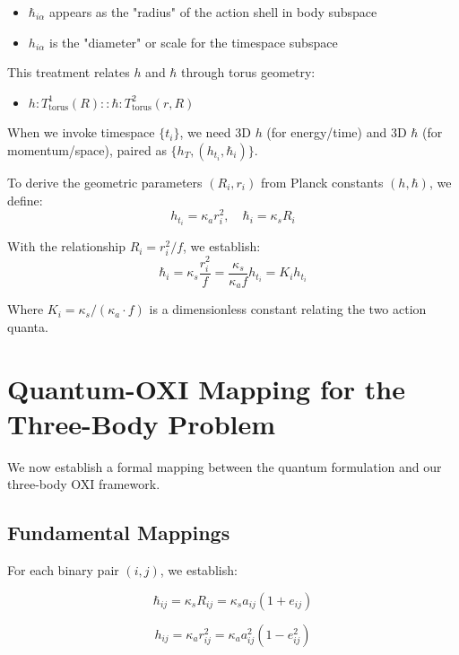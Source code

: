 \documentclass{article}
\begin{document}
\begin{itemize}
\item $\hbar_{i\alpha}$ appears as the "radius" of the action shell in body subspace
\item $h_{i\alpha}$ is the "diameter" or scale for the timespace subspace
\end{itemize}

This treatment relates $h$ and $\hbar$ through torus geometry:
\begin{itemize}
\item $h : T^1_{\text{torus}}(R) :: \hbar : T^2_{\text{torus}}(r, R)$
\end{itemize}

When we invoke timespace $\{t_i\}$, we need 3D $h$ (for energy/time) and 3D $\hbar$ (for momentum/space), paired as $\{h_T, (h_{t_i}, \hbar_i)\}$.

To derive the geometric parameters $(R_i, r_i)$ from Planck constants $(h, \hbar)$, we define:
\begin{equation}
h_{t_i} = \kappa_a r_i^2, \quad \hbar_i = \kappa_s R_i
\end{equation}

With the relationship $R_i = r_i^2/f$, we establish:
\begin{equation}
\hbar_i = \kappa_s \frac{r_i^2}{f} = \frac{\kappa_s}{\kappa_a f} h_{t_i} = K_i h_{t_i}
\end{equation}

Where $K_i = \kappa_s/(\kappa_a \cdot f)$ is a dimensionless constant relating the two action quanta.

\section{Quantum-OXI Mapping for the Three-Body Problem}

We now establish a formal mapping between the quantum formulation and our three-body OXI framework.

\subsection{Fundamental Mappings}

For each binary pair $(i,j)$, we establish:

\begin{equation}
\hbar_{ij} = \kappa_s R_{ij} = \kappa_s a_{ij}(1+e_{ij})
\end{equation}

\begin{equation}
h_{ij} = \kappa_a r_{ij}^2 = \kappa_a a_{ij}^2(1-e_{ij}^2)
\end{equation}
\end{document}
